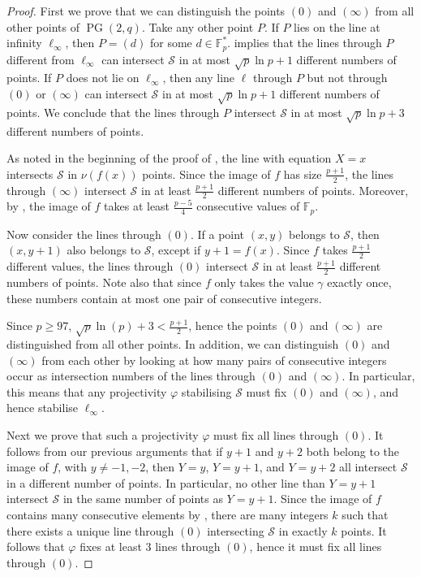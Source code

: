 \documentclass[a4paper, 12pt]{article}
\theoremstyle{definition}
\newcommand{\FF}{\mathbb F}
\newcommand{\ms}{\mathcal S}
\DeclareMathOperator{\PG}{PG}
\newcommand{\pg}{\PG}
\begin{document}
\begin{proof}
 First we prove that we can distinguish the points $(0)$ and $(\infty)$ from all other points of $\pg(2,q)$.
 Take any other point $P$.
 If $P$ lies on the line at infinity $\ell_\infty$, then $P = (d)$ for some $d \in \FF_p^*$.
  implies that the lines through $P$ different from $\ell_\infty$ can intersect $\ms$ in at most $\sqrt p \ln p + 1$ different numbers of points.
 If $P$ does not lie on $\ell_\infty$, then any line $\ell$ through $P$ but not through $(0)$ or $(\infty)$ can intersect $\ms$ in at most $\sqrt p \ln p + 1$ different numbers of points.
 We conclude that the lines through $P$ intersect $\ms$ in at most $\sqrt p \ln p + 3$ different numbers of points.

 As noted in the beginning of the proof of , the line with equation $X=x$ intersects $\ms$ in $\nu(f(x))$ points.
 Since the image of $f$ has size $\frac{p+1}2$, the lines through $(\infty)$ intersect $\ms$ in at least $\frac{p+1}2$ different numbers of points.
 Moreover, by , the image of $f$ takes at least $\frac{p-5}4$ consecutive values of $\FF_p$.

 Now consider the lines through $(0)$.
 If a point $(x,y)$ belongs to $\ms$, then $(x,y+1)$ also belongs to $\ms$, except if $y+1 = f(x)$.
 Since $f$ takes $\frac{p+1}{2}$ different values, the lines through $(0)$ intersect $\ms$ in at least $\frac{p+1}2$ different numbers of points.
 Note also that since $f$ only takes the value $\gamma$ exactly once, these numbers contain at most one pair of consecutive integers.

 Since $p \geq 97$, $\sqrt p \ln (p) + 3 < \frac{p+1}2$, hence the points $(0)$ and $(\infty)$ are distinguished from all other points.
 In addition, we can distinguish $(0)$ and $(\infty)$ from each other by looking at how many pairs of consecutive integers occur as intersection numbers of the lines through $(0)$ and $(\infty)$.
 In particular, this means that any projectivity $\varphi$ stabilising $\ms$ must fix $(0)$ and $(\infty)$, and hence stabilise $\ell_\infty$.
 
 Next we prove that such a projectivity $\varphi$ must fix all lines through $(0)$.
 It follows from our previous arguments that if $y+1$ and $y+2$ both belong to the image of $f$, with $y \neq -1, -2$, then $Y=y$, $Y=y+1$, and $Y=y+2$ all intersect $\ms$ in a different number of points.
 In particular, no other line than $Y=y+1$ intersect $\ms$ in the same number of points as $Y=y+1$.
 Since the image of $f$ contains many consecutive elements by , there are many integers $k$ such that there exists a unique line through $(0)$ intersecting $\ms$ in exactly $k$ points.
 It follows that $\varphi$ fixes at least 3 lines through $(0)$, hence it must fix all lines through $(0)$.


\end{proof}
\end{document}
